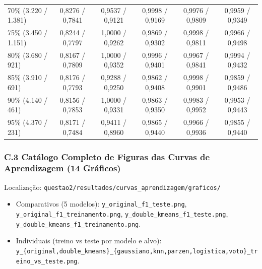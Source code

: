 \documentclass[a4paper,11pt]{article}
\begin{document}
\begin{center}
\begin{minipage}{\linewidth}
\begin{tabular}{l c c c c c}
70\% (3.220 / 1.381) & 0,8276 / 0,7841 & 0,9537 / 0,9121 & 0,9998 / 0,9169 & 0,9976 / 0,9809 & 0,9959 / 0,9349 \\
75\% (3.450 / 1.151) & 0,8244 / 0,7797 & 1,0000 / 0,9262 & 0,9869 / 0,9302 & 0,9998 / 0,9811 & 0,9966 / 0,9498 \\
80\% (3.680 / 921) & 0,8167 / 0,7809 & 1,0000 / 0,9352 & 0,9996 / 0,9401 & 0,9967 / 0,9841 & 0,9994 / 0,9432 \\
85\% (3.910 / 691) & 0,8176 / 0,7793 & 0,9288 / 0,9250 & 0,9862 / 0,9408 & 0,9998 / 0,9901 & 0,9859 / 0,9486 \\
90\% (4.140 / 461) & 0,8156 / 0,7853 & 1,0000 / 0,9331 & 0,9863 / 0,9350 & 0,9983 / 0,9952 & 0,9953 / 0,9443 \\
95\% (4.370 / 231) & 0,8171 / 0,7484 & 0,9411 / 0,8960 & 0,9865 / 0,9440 & 0,9966 / 0,9936 & 0,9855 / 0,9440 \\
\bottomrule
\end{tabular}
\end{minipage}
\end{center}


\subsubsection*{C.3 Catálogo Completo de Figuras das Curvas de Aprendizagem (14 Gráficos)}\label{sec:c-3-catalogo-completo-de-figuras-das-curvas-de-aprendizagem-14-graficos}


Localização: \texttt{questao2/\allowbreak resultados/\allowbreak curvas\_\allowbreak aprendizagem/\allowbreak graficos/\allowbreak }

\begin{itemize}[leftmargin=1.5em, itemsep=0.25em, topsep=0.25em]
  \item Comparativos (5 modelos): \texttt{y\_\allowbreak original\_\allowbreak f1\_\allowbreak teste.png}, \texttt{y\_\allowbreak original\_\allowbreak f1\_\allowbreak treinamento.png}, \texttt{y\_\allowbreak double\_\allowbreak kmeans\_\allowbreak f1\_\allowbreak teste.png}, \texttt{y\_\allowbreak double\_\allowbreak kmeans\_\allowbreak f1\_\allowbreak treinamento.png}.
  \item Individuais (treino vs teste por modelo e alvo): \texttt{y\_\allowbreak \{original,\allowbreak double\_\allowbreak kmeans\}\_\allowbreak \{gaussiano,\allowbreak knn,\allowbreak parzen,\allowbreak logistica,\allowbreak voto\}\_\allowbreak treino\_\allowbreak vs\_\allowbreak teste.png}.
\end{itemize}
\end{document}
